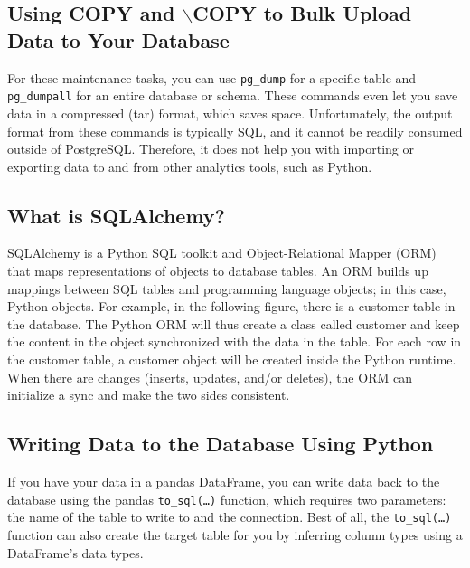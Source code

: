 \subsection{Using COPY and $\backslash$COPY to Bulk Upload Data to Your Database}
\begin{tcolorbox}[title=Note]
    For these maintenance tasks, you can use \verb|pg_dump| for a specific table and \verb|pg_dumpall| for an entire database or schema. These commands even let you save data in a compressed (tar) format, which saves space. Unfortunately, the output format from these commands is typically SQL, and it cannot be readily consumed outside of PostgreSQL. Therefore, it does not help you with importing or exporting data to and from other analytics tools, such as Python.
\end{tcolorbox}

\subsection{What is SQLAlchemy?}
SQLAlchemy is a Python SQL toolkit and Object-Relational Mapper (ORM) that maps representations of objects to database tables. An ORM builds up mappings between SQL tables and programming language objects; in this case, Python objects. For example, in the following figure, there is a customer table in the database. The Python ORM will thus create a class called customer and keep the content in the object synchronized with the data in the table. For each row in the customer table, a customer object will be created inside the Python runtime. When there are changes (inserts, updates, and/or deletes), the ORM can initialize a sync and make the two sides consistent.

\subsection{Writing Data to the Database Using Python}
If you have your data in a pandas DataFrame, you can write data back to the database using the pandas \verb|to_sql(…)| function, which requires two parameters: the name of the table to write to and the connection. Best of all, the \verb|to_sql(…)| function can also create the target table for you by inferring column types using a DataFrame's data types.

